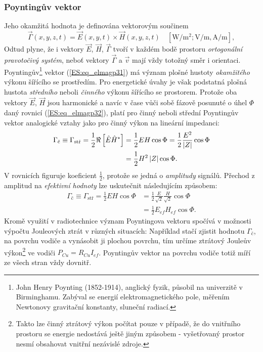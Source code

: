       \subsubsection{Poyntingův vektor}
        Jeho okamžitá hodnota je definována vektorovým součinem
        \begin{equation}\label{ES:eq_elmagp31}
          \vec{\Gamma}(x,y,z,t)=\vec{E}(x,y,t)\times\vec{H}(x,y,z,t)
          \quad [\si{\W\per\square\m}; \si{\V\per\m}, 
                 \si{\A\per\m}],
        \end{equation}
        Odtud plyne, že i vektory \(\vec{E}\), \(\vec{H}\), \(\vec{\Gamma}\) tvoří v každém bodě 
        prostoru \emph{ortogonální pravotočivý systém}, neboť vektory \(\vec{\Gamma}\) a 
        \(\vec{v}\) mají vždy totožný směr i orientaci. Poyntingův\footnote{John Henry Poynting 
        (1852-1914), anglický fyzik, působil na univerzitě v Birminghamu. Zabýval se energií 
        elektromagnetického pole, měřením Newtonovy gravitační konstanty, sluneční radiací.} 
        vektor (\ref{ES:eq_elmagp31}) má význam plošné hustoty \emph{okamžitého} výkonu šířícího 
        se prostředím. Pro energetické úvahy je však podstatná plošná hustota \emph{středního} 
        neboli \emph{činného} výkonu šířícího se prostorem. Protože oba vektory \(\vec{E}\), 
        \(\vec{H}\) jsou harmonické a navíc v čase vůči sobě fázově posunuté o úhel \(\Phi\) daný 
        rovnicí (\ref{ES:eq_elmagp32}), platí pro činný neboli střední Poyntingův vektor 
        analogické vztahy jako pro činný výkon na lineární impedanci:
        \begin{align}\label{ES:eq_elmagp33}
          \Gamma_\text{č} \equiv \Gamma_\text{stř} 
            = \frac{1}{2}\Re\left[\hat{E}\hat{H}^*\right]
            &= \frac{1}{2}EH\cos\Phi 
            = \frac{1}{2}\frac{E^2}{\left\lvert Z\right\rvert}\cos\Phi                  \nonumber \\
            &= \frac{1}{2}H^2\left\lvert Z\right\rvert\cos\Phi.
        \end{align}
        V rovnicích figuruje koeficient \(\frac{1}{2}\), protože se jedná o \emph{amplitudy} 
        signálů. Přechod z amplitud na \emph{efektivní hodnoty} lze uskutečnit následujícím 
        způsobem:
        \begin{align}\label{ES:eq_elmagp34}
          \Gamma_\text{č} \equiv \Gamma_\text{stř} 
            = \frac{1}{2}EH\cos\Phi 
            &= \frac{1}{2}\frac{E}{\sqrt{2}}\frac{H}{\sqrt{2}}\cos\Phi   \nonumber \\
            &= \frac{1}{2}E_{ef}H_{ef}\cos\Phi.
        \end{align}
        Kromě využití v radiotechnice význam Poyntingova vektoru spočívá v možnosti výpočtu
        Jouleových ztrát v různých situacích: Například stačí zjistit hodnotu \(\Gamma_\text{č}\), 
        na povrchu vodiče a vynásobit ji plochou povrchu, tím určíme ztrátový Jouleův 
        výkon\footnote{Takto lze činný ztrátový výkon počítat pouze v případě, že do vnitřního 
        prostoru se energie nedostává ještě jiným způsobem - vyšetřovaný prostor nesmí obsahovat 
        vnitřní nezávislé zdroje.} ve vodiči \(P_{Cu} = R_{Cu}I_{ef}\). Poyntingův vektor na 
        povrchu vodiče totiž míří ze všech stran vždy dovnitř.
        

